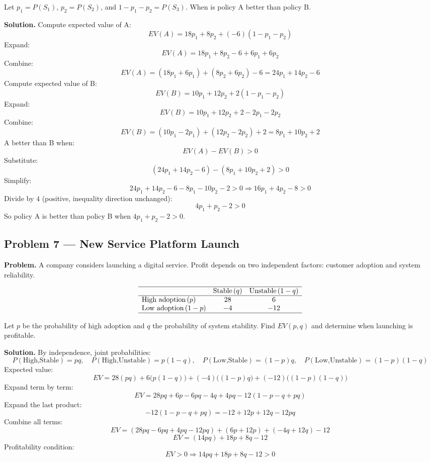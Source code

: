 \begin{ExamProblems}
		Let \(p_1=P(S_1)\), \(p_2=P(S_2)\), and \(1-p_1-p_2=P(S_3)\).  
		When is policy A better than policy B.
		
		\textbf{Solution.}
		Compute expected value of A:
		\[
		EV(A)=18p_1 + 8p_2 + (-6)(1-p_1-p_2)
		\]
		Expand:
		\[
		EV(A)=18p_1 + 8p_2 -6 + 6p_1 + 6p_2
		\]
		Combine:
		\[
		EV(A)=(18p_1+6p_1) + (8p_2+6p_2) - 6 = 24p_1 + 14p_2 - 6
		\]
		Compute expected value of B:
		\[
		EV(B)=10p_1 + 12p_2 + 2(1-p_1-p_2)
		\]
		Expand:
		\[
		EV(B)=10p_1 + 12p_2 + 2 - 2p_1 - 2p_2
		\]
		Combine:
		\[
		EV(B)=(10p_1-2p_1) + (12p_2-2p_2) + 2 = 8p_1 + 10p_2 + 2
		\]
		A better than B when:
		\[
		EV(A)-EV(B)>0
		\]
		Substitute:
		\[
		(24p_1+14p_2-6)-(8p_1+10p_2+2)>0
		\]
		Simplify:
		\[
		24p_1+14p_2-6-8p_1-10p_2-2>0
		\Rightarrow 16p_1+4p_2-8>0
		\]
		Divide by \(4\) (positive, inequality direction unchanged):
		\[
		4p_1+p_2-2>0
		\]
		So policy A is better than policy B when \(4p_1+p_2-2>0\).
		
		
		\hypertarget{c7-ex7}{}
		\item
		\subsection*{Problem 7 — New Service Platform Launch}
		
		\textbf{Problem.}
		A company considers launching a digital service. Profit depends on two independent factors:
		customer adoption and system reliability.
		
		\[
		\begin{array}{lcc}
			\hline
			& \text{Stable}\,(q) & \text{Unstable}\,(1-q) \\
			\hline
			\text{High adoption}\,(p) & 28 & 6 \\
			\text{Low adoption}\,(1-p) & -4 & -12 \\
			\hline
		\end{array}
		\]
		
		Let \(p\) be the probability of high adoption and \(q\) the probability of system stability.  
		Find \(EV(p,q)\) and determine when launching is profitable.
		
		\textbf{Solution.}
		By independence, joint probabilities:
		\[
		P(\text{High,Stable})=pq,\quad
		P(\text{High,Unstable})=p(1-q),\quad
		P(\text{Low,Stable})=(1-p)q,\quad
		P(\text{Low,Unstable})=(1-p)(1-q)
		\]
		Expected value:
		\[
		EV=28(pq)+6\bigl(p(1-q)\bigr)+(-4)\bigl((1-p)q\bigr)+(-12)\bigl((1-p)(1-q)\bigr)
		\]
		Expand term by term:
		\[
		EV=28pq + 6p - 6pq - 4q + 4pq - 12(1-p-q+pq)
		\]
		Expand the last product:
		\[
		-12(1-p-q+pq)=-12 + 12p + 12q - 12pq
		\]
		Combine all terms:
		\[
		EV=(28pq-6pq+4pq-12pq) + (6p+12p) + (-4q+12q) - 12
		\]
		\[
		EV=(14pq) + 18p + 8q - 12
		\]
		Profitability condition:
		\[
		EV>0 \Rightarrow 14pq+18p+8q-12>0
		\]
		

\end{ExamProblems}

